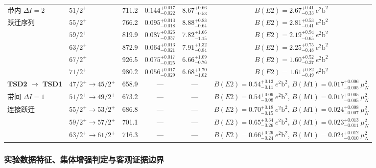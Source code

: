 \begin{table}[!htbp]
\begin{tabularx}{\textwidth}{llcccc}
带内 $\Delta I = 2$ & $51/2^+$ & 711.2 & $0.144_{-0.022}^{+0.017}$ & $8.67_{-0.53}^{+0.66}$ & $B(E2) = 2.67_{-0.33}^{+0.41}\ e^2\mathrm{b}^2$ \\
跃迁序列 & $55/2^+$ & 766.2 & $0.095_{-0.018}^{+0.013}$ & $8.88_{-0.64}^{+0.83}$ & $B(E2) = 2.81_{-0.41}^{+0.53}\ e^2\mathrm{b}^2$ \\
& $59/2^+$ & 819.9 & $0.087_{-0.037}^{+0.026}$ & $7.82_{-1.15}^{+1.66}$ & $B(E2) = 2.19_{-0.65}^{+0.94}\ e^2\mathrm{b}^2$ \\
& $63/2^+$ & 872.9 & $0.064_{-0.021}^{+0.013}$ & $7.91_{-0.84}^{+1.32}$ & $B(E2) = 2.25_{-0.48}^{+0.75}\ e^2\mathrm{b}^2$ \\
& $67/2^+$ & 926.5 & $0.075_{-0.025}^{+0.017}$ & $6.66_{-0.76}^{+1.09}$ & $B(E2) = 1.60_{-0.37}^{+0.52}\ e^2\mathrm{b}^2$ \\
& $71/2^+$ & 980.2 & $0.056_{-0.029}^{+0.017}$ & $6.68_{-1.02}^{+1.70}$ & $B(E2) = 1.61_{-0.49}^{+0.82}\ e^2\mathrm{b}^2$ \\
\hline
\textbf{TSD2} $\to$ \textbf{TSD1} & $47/2^+ \to 45/2^+$ & 658.9 & — & — & $B(E2) = 0.54_{-0.11}^{+0.13}\ e^2\mathrm{b}^2$, $B(M1) = 0.017_{-0.005}^{+0.006}\ \mu_N^2$ \\
带间 $\Delta I = 1$ & $51/2^+ \to 49/2^+$ & 673.2 & — & — & $B(E2) = 0.54_{-0.08}^{+0.09}\ e^2\mathrm{b}^2$, $B(M1) = 0.017_{-0.005}^{+0.005}\ \mu_N^2$ \\
连接跃迁 & $55/2^+ \to 53/2^+$ & 686.8 & — & — & $B(E2) = 0.70_{-0.15}^{+0.18}\ e^2\mathrm{b}^2$, $B(M1) = 0.024_{-0.007}^{+0.008}\ \mu_N^2$ \\
& $59/2^+ \to 57/2^+$ & 701.1 & — & — & $B(E2) = 0.65_{-0.26}^{+0.34}\ e^2\mathrm{b}^2$, $B(M1) = 0.023_{-0.011}^{+0.013}\ \mu_N^2$ \\
& $63/2^+ \to 61/2^+$ & 716.3 & — & — & $B(E2) = 0.66_{-0.24}^{+0.29}\ e^2\mathrm{b}^2$, $B(M1) = 0.024_{-0.010}^{+0.012}\ \mu_N^2$ \\
\hline\hline
\end{tabularx}
\end{table}

\subsubsection{实验数据特征、集体增强判定与客观证据边界}

